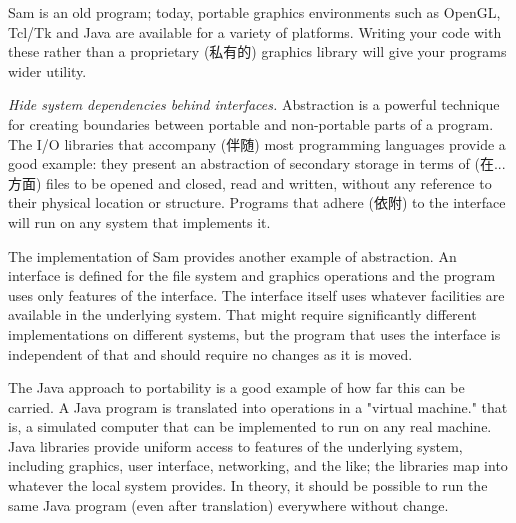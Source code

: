 Sam is an old program; today, portable graphics environments such as
OpenGL, Tcl/Tk and Java are available for a variety of platforms. Writing
your code with these rather than a proprietary (私有的) graphics library
will give your programs wider utility.

\emph{Hide system dependencies behind interfaces.} Abstraction is a
powerful technique for creating boundaries between portable and
non-portable parts of a program.  The I/O libraries that accompany (伴随)
most programming languages provide a good example: they present an
abstraction of secondary storage in terms of (在...方面) files to be opened
and closed, read and written, without any reference to their physical
location or structure. Programs that adhere (依附) to the interface will
run on any system that implements it.

The implementation of Sam provides another example of abstraction. An
interface is defined for the file system and graphics operations and the
program uses only features of the interface. The interface itself uses
whatever facilities are available in the underlying system. That might
require significantly different implementations on different systems, but
the program that uses the interface is independent of that and should
require no changes as it is moved.

The Java approach to portability is a good example of how far this can be
carried.  A Java program is translated into operations in a "virtual
machine." that is, a simulated computer that can be implemented to run on
any real machine. Java libraries provide uniform access to features of the
underlying system, including graphics, user interface, networking, and the
like; the libraries map into whatever the local system provides. In theory,
it should be possible to run the same Java program (even after translation)
everywhere without change.
